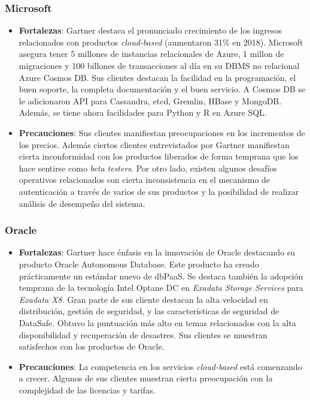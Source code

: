 \documentclass[11pt,letterpaper]{article}
\begin{document}
		\subsubsection{Microsoft}
		\begin{itemize}
		\item {\bf Fortalezas}: Gartner destaca el pronunciado crecimiento de los ingresos relacionados con productos {\em cloud-based} (aumentaron 31\% en 2018). Microsoft asegura tener 5 millones de instancias relacionales de Azure, 1 millon de migraciones y 100 billones de transacciones al día en su DBMS no relacional Azure Cosmos DB. Sus clientes destacan la facilidad en la programación, el buen soporte, la completa documentación y el buen servicio. A Cosmos DB se le adicionaron API para Cassandra, etcd, Gremlin, HBase y MongoDB. Además, se tiene ahora facilidades para Python y R en Azure SQL.
		\item {\bf Precauciones}:
		Sus clientes manifiestan preocupaciones en los incrementos de los precios. Además ciertos clientes entrevistados por Gartner manifiestan cierta inconformidad con los productos liberados de forma temprana que los hace sentirse como {\em beta testers}. Por otro lado, existen algunos desafíos operativos relacionados con cierta inconsistencia en el mecanismo de autenticación a través de varios de sus productos y la posibilidad de realizar análisis de desempeño del sistema.
		\end{itemize}
		\subsubsection{Oracle}
		\begin{itemize}
		\item {\bf Fortalezas}: Gartner hace énfasis en la innovación de Oracle destacando su producto Oracle Autonomous Database. Este producto ha creado prácticamente un estándar nuevo de dbPaaS. Se destaca también la adopción temprana de la tecnología Intel Optane DC en {\em Exadata Storage Services} para {\em Exadata X8}. Gran parte de sus cliente destacan la alta velocidad en distribución, gestión de seguridad, y las características de seguridad de DataSafe. Obtuvo la puntuación más alto en temas relacionados con la alta disponibilidad y recuperación de desastres. Sus clientes se muestran satisfechos con los productos de Oracle.
		\item {\bf Precauciones}: La competencia en los servicios {\em cloud-based} está comenzando a crecer. Algunos de sus clientes muestran cierta preocupación con la complejidad de las licencias y tarifas.
		\end{itemize}
\end{document}
